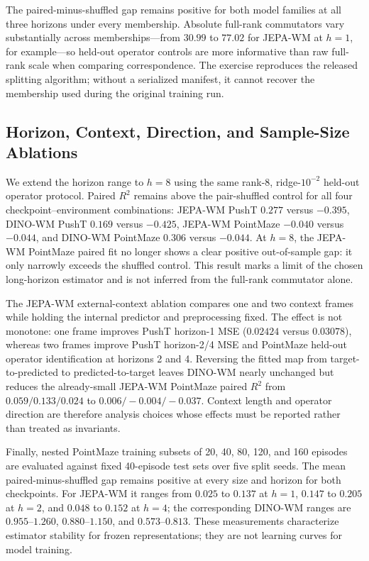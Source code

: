 \documentclass{article}
\begin{document}
The paired-minus-shuffled gap remains positive for both model families at all
three horizons under every membership. Absolute full-rank commutators vary
substantially across memberships---from $30.99$ to $77.02$ for JEPA-WM at
$h=1$, for example---so held-out operator controls are more informative than
raw full-rank scale when comparing correspondence. The exercise reproduces the
released splitting algorithm; without a serialized manifest, it cannot recover
the membership used during the original training run.

\subsection{Horizon, Context, Direction, and Sample-Size Ablations}
\label{sec:supp-temporal-ablations}

We extend the horizon range to $h=8$ using the same rank-8,
ridge-$10^{-2}$ held-out operator protocol. Paired $R^2$ remains above the
pair-shuffled control for all four checkpoint--environment combinations: JEPA-WM
PushT $0.277$ versus $-0.395$, DINO-WM PushT $0.169$ versus $-0.425$,
JEPA-WM PointMaze $-0.040$ versus $-0.044$, and DINO-WM PointMaze $0.306$
versus $-0.044$. At $h=8$, the JEPA-WM PointMaze paired fit no longer shows a
clear positive out-of-sample gap: it only narrowly exceeds the shuffled
control. This result marks a limit of the chosen long-horizon estimator and is
not inferred from the full-rank commutator alone.

The JEPA-WM external-context ablation compares one and two context frames while
holding the internal predictor and preprocessing fixed. The effect is not
monotone: one frame improves PushT horizon-1 MSE ($0.02424$ versus $0.03078$),
whereas two frames improve PushT horizon-2/4 MSE and PointMaze held-out
operator identification at horizons 2 and 4. Reversing the fitted map from
target-to-predicted to predicted-to-target leaves DINO-WM nearly unchanged but
reduces the already-small JEPA-WM PointMaze paired $R^2$ from
$0.059/0.133/0.024$ to $0.006/-0.004/-0.037$. Context length and operator
direction are therefore analysis choices whose effects must be reported rather
than treated as invariants.

Finally, nested PointMaze training subsets of 20, 40, 80, 120, and 160
episodes are evaluated against fixed 40-episode test sets over five split
seeds. The mean paired-minus-shuffled gap remains positive at every size and
horizon for both checkpoints. For JEPA-WM it ranges from $0.025$ to $0.137$ at
$h=1$, $0.147$ to $0.205$ at $h=2$, and $0.048$ to $0.152$ at $h=4$; the
corresponding DINO-WM ranges are $0.955$--$1.260$, $0.880$--$1.150$, and
$0.573$--$0.813$. These measurements characterize estimator stability for
frozen representations; they are not learning curves for model training.
\end{document}
